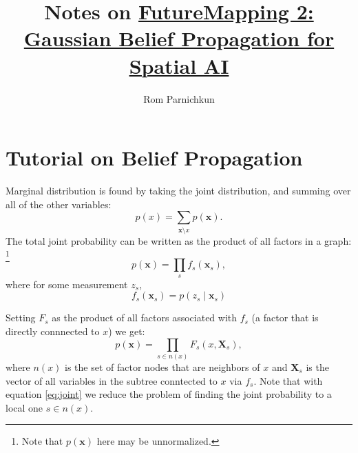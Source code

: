 \documentclass[twocolumn]{article}
\begin{document}
\title{Notes on \href{https://arxiv.org/pdf/1910.14139.pdf}{FutureMapping 2: Gaussian Belief Propagation for Spatial AI}}
\author{Rom Parnichkun}

\maketitle

\section{Tutorial on Belief Propagation}

Marginal distribution is found by taking the joint distribution, and summing over all of the other variables:
\begin{equation}
    p(x) = \sum_{\textbf{x} \setminus x}{p(\textbf{x})}.
    \label{eq:marginal}
\end{equation}
The total joint probability can be written as the product of all factors in a graph: \footnote{Note that $p(\textbf{x})$ here may be unnormalized.}
\begin{equation}
    p(\textbf{x}) = \prod_s{f_s(\textbf{x}_s)},
\end{equation}
where for some measurement $z_s$,
\begin{equation}
    f_s(\textbf{x}_s) = p(z_s \mid \textbf{x}_s)
\end{equation}

Setting $F_s$ as the product of all factors associated with $f_s$ (a factor that is directly connnected to $x$) we get:
\begin{equation}
    p(\textbf{x}) = \prod_{s \in n(x)}{F_s(x, \textbf{X}_s)},
    \label{eq:joint}
\end{equation}
where $n(x)$ is the set of factor nodes that are neighbors of $x$ and $\textbf{X}_s$ is the vector of all variables in the subtree conntected to $x$ via $f_s$. Note that with equation \ref{eq:joint} we reduce the problem of finding the joint probability to a local one $s\in n(x)$.
 
\end{document}
